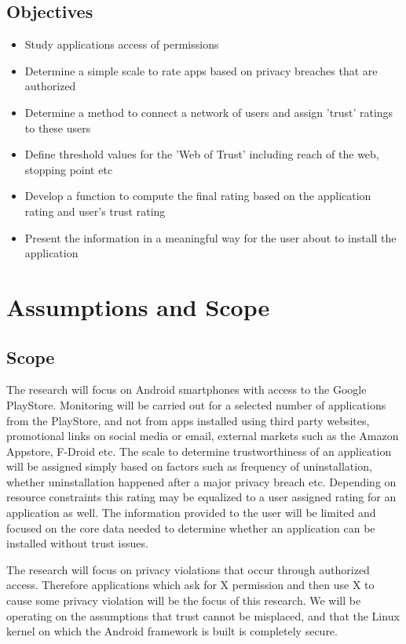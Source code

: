 \subsection{Objectives}
\begin{itemize}
\item Study applications access of permissions
\item Determine a simple scale to rate apps based on privacy breaches that are authorized
\item Determine a method to connect a network of users and assign 'trust' ratings to these users
\item Define threshold values for the 'Web of Trust' including reach of the web, stopping point etc
\item Develop a function to compute the final rating based on the application rating and user's trust rating
\item Present the information in a meaningful way for the user about to install the application
\end{itemize}

\section{Assumptions and Scope}
\subsection{Scope}
The research will focus on Android smartphones with access to the Google PlayStore. Monitoring will be carried out for a selected number of applications from the PlayStore, and not from apps installed using third party websites, promotional links on social media or email, external markets such as the Amazon Appstore, F-Droid etc. The scale to determine trustworthiness of an application will be assigned simply based on factors such as frequency of uninstallation, whether uninstallation happened after a major privacy breach etc. Depending on resource constraints this rating may be equalized to a user assigned rating for an application as well. The information provided to the user will be limited and focused on the core data needed to determine whether an application can be installed without trust issues.
\smallskip 

The research will focus on privacy violations that occur through authorized access. Therefore applications which ask for X permission and then use X to cause some privacy violation will be the focus of this research. We will be operating on the assumptions that trust cannot be misplaced, and that the Linux kernel on which the Android framework is built is completely secure.

